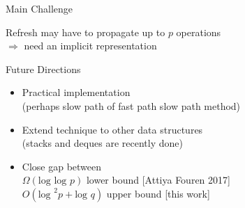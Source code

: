 \documentclass[compress]{beamer}
\newcommand{\Red}[1]{{\color{red}#1}}
\renewcommand{\log}{\mbox{log }} %
\begin{document}
\begin{frame}{Main Challenge}

Refresh may have to propagate up to $p$ operations\\
$\Rightarrow$ need an \Red{implicit representation}




\end{frame}





\begin{frame}{Future Directions}

\begin{itemize}
\item
Practical implementation\\
(perhaps slow path of fast path slow path method)
\item
Extend technique to other data structures\\
 (stacks and deques are recently done)
 \item
Close gap between\\
$\Omega(\log \log p)$ lower bound \hfill {\small [Attiya Fouren 2017]}\\
$O(\log^2 p + \log q)$ upper bound \hfill {\small [this work]}

\end{itemize}

\end{frame}
\end{document}
